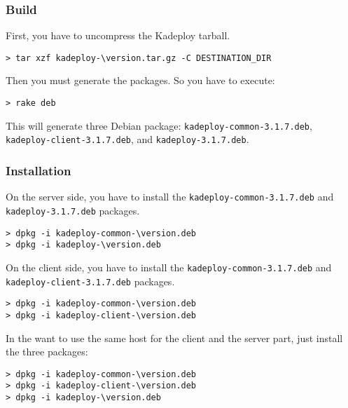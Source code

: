 \documentclass[a4wide,10pt,oneside]{book}
\newcommand{\version}{3.1.7}
\begin{document}
\subsubsection{Build}
\noindent First, you have to uncompress the Kadeploy tarball.
\begin{small}
\begin{Verbatim}[commandchars=\\\{\}]
> tar xzf kadeploy-\version.tar.gz -C DESTINATION_DIR
\end{Verbatim}
\end{small}

\noindent Then you must generate the packages. So you have to execute:
\begin{small}
\begin{verbatim}
> rake deb
\end{verbatim}
\end{small}
This will generate three Debian package: \texttt{kadeploy-common-\version.deb}, \texttt{kadeploy-client-\version.deb}, and \texttt{kadeploy-\version.deb}.
\subsubsection{Installation}
\noindent On the server side, you have to install the \texttt{kadeploy-common-\version.deb} and \texttt{kadeploy-\version.deb} packages.
\begin{small}
\begin{Verbatim}[commandchars=\\\{\}]
> dpkg -i kadeploy-common-\version.deb
> dpkg -i kadeploy-\version.deb
\end{Verbatim}
\end{small}

\noindent On the client side, you have to install the \texttt{kadeploy-common-\version.deb} and \texttt{kadeploy-client-\version.deb} packages.
\begin{small}
\begin{Verbatim}[commandchars=\\\{\}]
> dpkg -i kadeploy-common-\version.deb
> dpkg -i kadeploy-client-\version.deb
\end{Verbatim}
\end{small}

\noindent In the want to use the same host for the client and the server part, just install the three packages:
\begin{small}
\begin{Verbatim}[commandchars=\\\{\}]
> dpkg -i kadeploy-common-\version.deb
> dpkg -i kadeploy-client-\version.deb
> dpkg -i kadeploy-\version.deb
\end{Verbatim}
\end{small}
\end{document}
